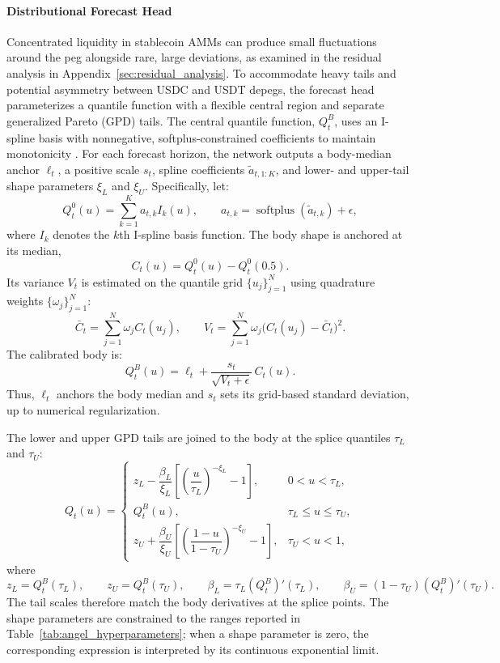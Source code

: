 \documentclass[a4paper,fleqn]{cas-sc}
\begin{document}
\paragraph{Distributional Forecast Head} 
Concentrated liquidity in stablecoin AMMs can produce small fluctuations around the peg alongside rare, large deviations, as examined in the residual analysis in Appendix~\ref{sec:residual_analysis}. To accommodate heavy tails and potential asymmetry between USDC and USDT depegs, the forecast head parameterizes a quantile function with a flexible central region and separate generalized Pareto (GPD) tails. The central quantile function, $Q_t^{B}$, uses an I-spline basis with nonnegative, softplus-constrained coefficients to maintain monotonicity \citep{xu2023}. For each forecast horizon, the network outputs a body-median anchor $\ell_t$, a positive scale $s_t$, spline coefficients $\tilde a_{t,1:K}$, and lower- and upper-tail shape parameters $\xi_L$ and $\xi_U$. Specifically, let:
\begin{equation}
Q_t^0(u)=\sum_{k=1}^{K} a_{t,k} I_k(u),
\qquad
a_{t,k}=\operatorname{softplus}(\tilde a_{t,k})+\epsilon,
\end{equation}
where $I_k$ denotes the $k$th I-spline basis function. The body shape is
anchored at its median,
\begin{equation}
C_t(u)=Q_t^0(u)-Q_t^0(0.5).
\end{equation}
Its variance $V_t$ is estimated on the quantile grid $\{u_j\}_{j=1}^{N}$
using quadrature weights $\{\omega_j\}_{j=1}^{N}$:
\begin{equation}
\bar C_t=\sum_{j=1}^{N}\omega_j C_t(u_j),
\qquad
V_t=\sum_{j=1}^{N}\omega_j
       \bigl(C_t(u_j)-\bar C_t\bigr)^2.
\end{equation}
The calibrated body is:
\begin{equation}
Q_t^B(u)=\ell_t+
          \frac{s_t}{\sqrt{V_t+\epsilon}}\,C_t(u).
\end{equation}
Thus, $\ell_t$ anchors the body median and $s_t$ sets its grid-based
standard deviation, up to numerical regularization.

The lower and upper GPD tails are joined to the body at the splice
quantiles $\tau_L$ and $\tau_U$:
\begin{equation}
Q_t(u)=
\begin{cases}
z_L-\dfrac{\beta_L}{\xi_L}
\left[\left(\dfrac{u}{\tau_L}\right)^{-\xi_L}-1\right],
& 0<u<\tau_L,\\[2ex]
Q_t^B(u),
& \tau_L\leq u\leq\tau_U,\\[1.2ex]
z_U+\dfrac{\beta_U}{\xi_U}
\left[\left(\dfrac{1-u}{1-\tau_U}\right)^{-\xi_U}-1\right],
& \tau_U<u<1,
\end{cases}
\end{equation}
where
\[
z_L=Q_t^B(\tau_L),\qquad z_U=Q_t^B(\tau_U),\qquad
\beta_L=\tau_L(Q_t^B)'(\tau_L),\qquad
\beta_U=(1-\tau_U)(Q_t^B)'(\tau_U).
\]
The tail scales therefore match the body derivatives at the splice
points. The shape parameters are constrained to the ranges reported in
Table~\ref{tab:angel_hyperparameters}; when a shape parameter is zero,
the corresponding expression is interpreted by its continuous
exponential limit.
\end{document}
